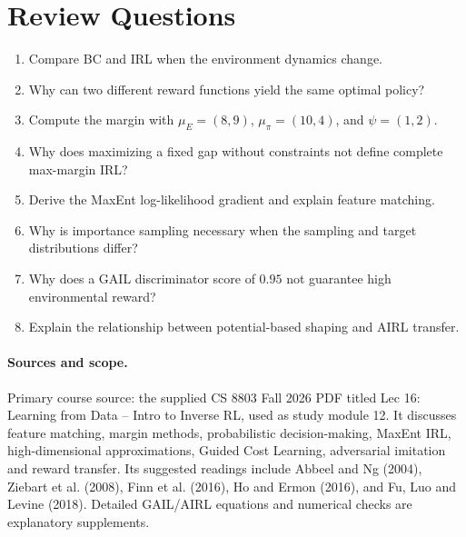 \section{Review Questions}
\begin{enumerate}
\item Compare BC and IRL when the environment dynamics change.
\item Why can two different reward functions yield the same optimal policy?
\item Compute the margin with $\mu_E=(8,9)$, $\mu_\pi=(10,4)$, and $\psi=(1,2)$.
\item Why does maximizing a fixed gap without constraints not define complete max-margin IRL?
\item Derive the MaxEnt log-likelihood gradient and explain feature matching.
\item Why is importance sampling necessary when the sampling and target distributions differ?
\item Why does a GAIL discriminator score of $0.95$ not guarantee high environmental reward?
\item Explain the relationship between potential-based shaping and AIRL transfer.
\end{enumerate}

\paragraph{Sources and scope.}
Primary course source: the supplied CS 8803 Fall 2026 PDF titled Lec 16: Learning from Data -- Intro to Inverse RL, used as study module 12. It discusses feature matching, margin methods, probabilistic decision-making, MaxEnt IRL, high-dimensional approximations, Guided Cost Learning, adversarial imitation and reward transfer. Its suggested readings include Abbeel and Ng (2004), Ziebart et al. (2008), Finn et al. (2016), Ho and Ermon (2016), and Fu, Luo and Levine (2018). Detailed GAIL/AIRL equations and numerical checks are explanatory supplements.
